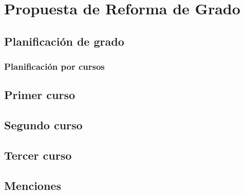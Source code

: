 \chapter{Propuesta de Reforma de Grado}


\section{Planificación de grado}

\subsection{Planificación por cursos}

\section{Primer curso}

\section{Segundo curso}

\section{Tercer curso}

\section{Menciones}

